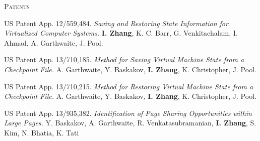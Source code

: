\documentclass[10pt,minionpro]{report}
\newlength{\sectiongap}
\newlength{\sectioncolwidth}
\newlength{\colgap}
\newlength{\stuffwidth}
\newenvironment{rtable}{
  \begin{minipage}{\textwidth}
  }{
  \end{minipage}
}
\newenvironment{rsection}[1]{
  \begin{minipage}[t]{\sectioncolwidth}
    \textsc{#1}
  \end{minipage}
  \hspace{\colgap}
  \begin{minipage}[t]{\stuffwidth}
  }{
    \removelastskip
  \end{minipage}
  \\[\sectiongap]
}
\begin{document}
\begin{rtable}
  \begin{rsection}{Patents}
    US Patent App. 12/559,484.
    \textit{Saving and Restoring State Information for Virtualized
      Computer Systems.} 
    \textbf{I. Zhang}, K. C. Barr, G. Venkitachalam, I. Ahmad, A. Garthwaite, J. Pool.\\\vspace{-0.5em}

    US Patent App. 13/710,185. 
    \textit{Method for Saving Virtual Machine State from a Checkpoint
    File.}  A. Garthwaite, Y. Baskakov, \textbf{I. Zhang}, K. Christopher,
    J. Pool.\\\vspace{-0.5em}

    US Patent App. 13/710,215. \textit{Method for Restoring Virtual Machine State from a Checkpoint
    File.} A. Garthwaite, Y. Baskakov, \textbf{I. Zhang}, K. Christopher,
    J. Pool.\\\vspace{-0.5em}
    
    US Patent App. 13/935,382. \textit{Identification of Page Sharing Opportunities within Large Pages.} Y. Baskakov, A. Garthwaite, R. Venkatasubramanian, \textbf{I. Zhang}, S. Kim, N. Bhatia, K. Tati\\
  \end{rsection}


\end{rtable}
\end{document}
